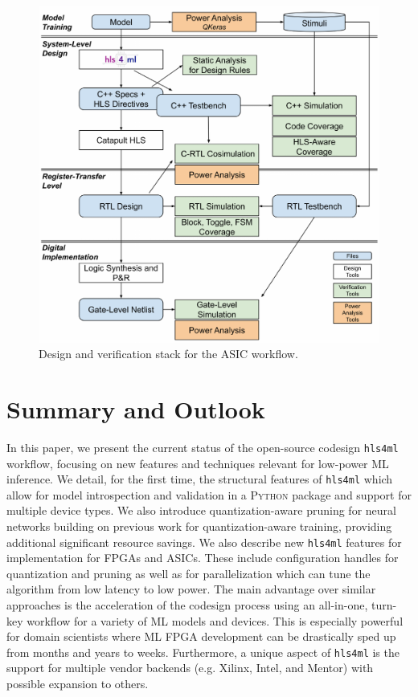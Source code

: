 \documentclass[sigconf]{acmart}
\newcommand{\hlsfml}{\texttt{hls4ml}\xspace}
\begin{document}

\begin{figure}[t!]
\centering
\includegraphics[width=0.9\columnwidth]{Figs/designMethodology.pdf}
\caption{Design and verification stack for the ASIC workflow.}
\label{fig:asic_workflow}
\end{figure}

\section{Summary and Outlook}
\label{sec:sum}

In this paper, we present the current status of the open-source codesign \hlsfml workflow, focusing on new features and techniques relevant for low-power ML inference.
We detail, for the first time, the structural features of \hlsfml which allow for model introspection and validation in a \textsc{Python} package and support for multiple device types.  
We also introduce quantization-aware pruning for neural networks building on previous work for quantization-aware training, providing additional significant resource savings. 
We also describe new \hlsfml features for implementation for FPGAs and ASICs. 
These include configuration handles for quantization and pruning as well as for parallelization which can tune the algorithm from low latency to low power.  
The main advantage over similar approaches is the acceleration of the codesign process using an all-in-one, turn-key workflow for a variety of ML models and devices.  
This is especially powerful for domain scientists where ML FPGA development can be drastically sped up from months and years to weeks.  
Furthermore, a unique aspect of \hlsfml is the support for multiple vendor backends (e.g. Xilinx, Intel, and Mentor) with possible expansion to others.
\end{document}
